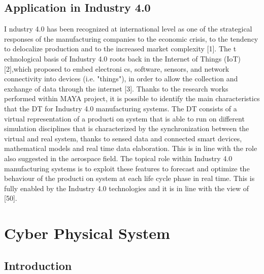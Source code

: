 \subsection{Application in Industry 4.0}

I ndustry 4.0 has been recognized at international level as one of the strategical responses of  the manufacturing companies to the economic crisis, to the tendency to delocalize production and to the increased market complexity [1]. The t echnological basis of Industry 4.0 roots back in the Internet of Things (IoT) [2],which proposed to embed electroni cs, software, sensors, and network connectivity into devices (i.e. "things"), in order to allow the collection and exchange of data through the internet [3].
Thanks to the research works performed within MAYA project, it is possible to identify the main characteristics that the DT for Industry 4.0 manufacturing systems. The DT consists of a virtual representation of a producti on system that is able to run on different simulation disciplines that is characterized by the synchronization between the virtual and real system, thanks to sensed data and connected smart devices, mathematical models and real time data elaboration. This is in line with the role also suggested in the aerospace field. The topical role within  Industry 4.0 manufacturing systems is to exploit these features to forecast and optimize the behaviour of the producti on system at each life cycle phase in real time. This is fully enabled by the Industry 4.0 technologies and it is in line with the view of [50]. 



\section{Cyber Physical System}

\subsection{Introduction}

